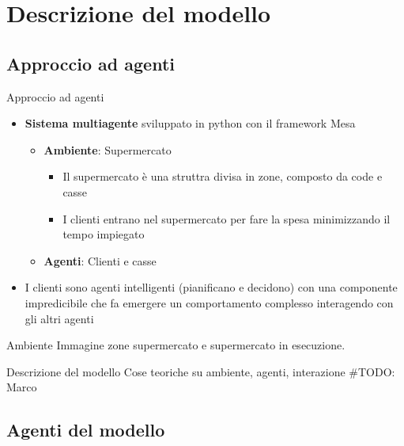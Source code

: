 \section{Descrizione del modello}

\subsection{Approccio ad agenti}
\begin{frame}{Approccio ad agenti}
	\begin{itemize}
		\item \textbf{Sistema multiagente} sviluppato in python con il framework Mesa
		\begin{itemize}
			\item \textbf{Ambiente}: Supermercato
			\begin{itemize}
				\item Il supermercato è una struttra divisa in zone, composto da code e casse
				\item I clienti entrano nel supermercato per fare la spesa minimizzando il tempo impiegato
			\end{itemize}
			\item \textbf{Agenti}: Clienti e casse
		\end{itemize}
	
		\item I clienti sono agenti intelligenti (pianificano e decidono) con una componente impredicibile che fa emergere un comportamento complesso interagendo con gli altri agenti
	\end{itemize}
\end{frame}

\begin{frame}{Ambiente}
	Immagine zone supermercato e supermercato in esecuzione.
\end{frame}




\begin{frame}{Descrizione del modello}
	\centering
	Cose teoriche su ambiente, agenti, interazione
	\#TODO: Marco
\end{frame}



\subsection{Agenti del modello}

